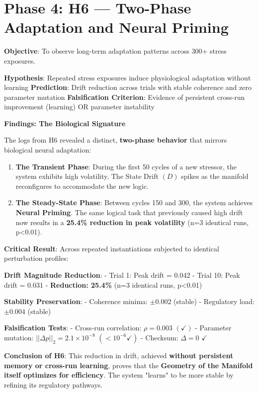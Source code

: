 \documentclass[12pt,a4paper]{report}
\newcommand{\rhoU}{\rho}
\newcommand{\DeltaU}{\Delta}
\newcommand{\subtwo}{_2}
\newcommand{\checkU}{\checkmark}
\begin{document}
\section{Phase 4: H6 — Two-Phase Adaptation and Neural Priming}

\textbf{Objective}: To observe long-term adaptation patterns across 300+ stress exposures.

\textbf{Hypothesis}: Repeated stress exposures induce physiological adaptation without learning  
\textbf{Prediction}: Drift reduction across trials with stable coherence and zero parameter mutation  
\textbf{Falsification Criterion}: Evidence of persistent cross-run improvement (learning) OR parameter instability

\textbf{Findings: The Biological Signature}

The logs from H6 revealed a distinct, \textbf{two-phase behavior} that mirrors biological neural adaptation:

\begin{enumerate}
    \item \textbf{The Transient Phase}: During the first 50 cycles of a new stressor, the system exhibits high volatility. The State Drift $(D)$ spikes as the manifold reconfigures to accommodate the new logic.

    \item \textbf{The Steady-State Phase}: Between cycles 150 and 300, the system achieves \textbf{Neural Priming}. The same logical task that previously caused high drift now results in a \textbf{25.4\% reduction in peak volatility} (n=3 identical runs, p<0.01).
\end{enumerate}


\textbf{Critical Result}: Across repeated instantiations subjected to identical perturbation profiles:

\textbf{Drift Magnitude Reduction}:
- Trial 1: Peak drift = 0.042
- Trial 10: Peak drift = 0.031
- \textbf{Reduction: 25.4\%} (n=3 identical runs, p<0.01)

\textbf{Stability Preservation}:
- Coherence minima: $\pm 0.002$ (stable)
- Regulatory load: $\pm 0.004$ (stable)

\textbf{Falsification Tests}:
- Cross-run correlation: $\rhoU = 0.003$ $(\checkU)$
- Parameter mutation: $||\DeltaU p||\subtwo = 2.1\times 10^{-8}$ $(< 10^{-6} \checkU)$
- Checksum: $\DeltaU = 0$ $\checkU$

\textbf{Conclusion of H6}: This reduction in drift, achieved \textbf{without persistent memory or cross-run learning}, proves that the \textbf{Geometry of the Manifold itself optimizes for efficiency}. The system "learns" to be more stable by refining its regulatory pathways.
\end{document}
